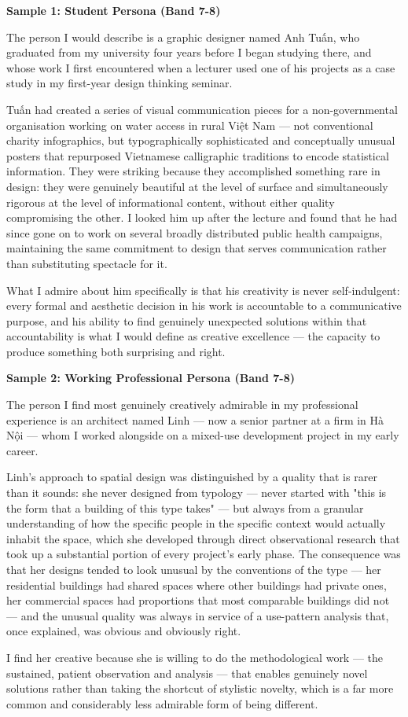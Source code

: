 \begin{ieltsanswer}
\textbf{Sample 1: Student Persona (Band 7-8)}

The person I would describe is a graphic designer named Anh Tuấn, who graduated from my university four years before I began studying there, and whose work I first encountered when a lecturer used one of his projects as a case study in my first-year design thinking seminar.

Tuấn had created a series of visual communication pieces for a non-governmental organisation working on water access in rural Việt Nam — not conventional charity infographics, but typographically sophisticated and conceptually unusual posters that repurposed Vietnamese calligraphic traditions to encode statistical information. They were striking because they accomplished something rare in design: they were genuinely beautiful at the level of surface and simultaneously rigorous at the level of informational content, without either quality compromising the other. I looked him up after the lecture and found that he had since gone on to work on several broadly distributed public health campaigns, maintaining the same commitment to design that serves communication rather than substituting spectacle for it.

What I admire about him specifically is that his creativity is never self-indulgent: every formal and aesthetic decision in his work is accountable to a communicative purpose, and his ability to find genuinely unexpected solutions within that accountability is what I would define as creative excellence — the capacity to produce something both surprising and right.

\textbf{Sample 2: Working Professional Persona (Band 7-8)}

The person I find most genuinely creatively admirable in my professional experience is an architect named Linh — now a senior partner at a firm in Hà Nội — whom I worked alongside on a mixed-use development project in my early career.

Linh's approach to spatial design was distinguished by a quality that is rarer than it sounds: she never designed from typology — never started with "this is the form that a building of this type takes" — but always from a granular understanding of how the specific people in the specific context would actually inhabit the space, which she developed through direct observational research that took up a substantial portion of every project's early phase. The consequence was that her designs tended to look unusual by the conventions of the type — her residential buildings had shared spaces where other buildings had private ones, her commercial spaces had proportions that most comparable buildings did not — and the unusual quality was always in service of a use-pattern analysis that, once explained, was obvious and obviously right.

I find her creative because she is willing to do the methodological work — the sustained, patient observation and analysis — that enables genuinely novel solutions rather than taking the shortcut of stylistic novelty, which is a far more common and considerably less admirable form of being different.
\end{ieltsanswer}


